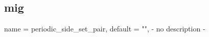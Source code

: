 \subsection{mig}

\begin{parameter}{
    name    = {periodic_side_set_pair},
    default = {""},
}
- no description -
\end{parameter}

